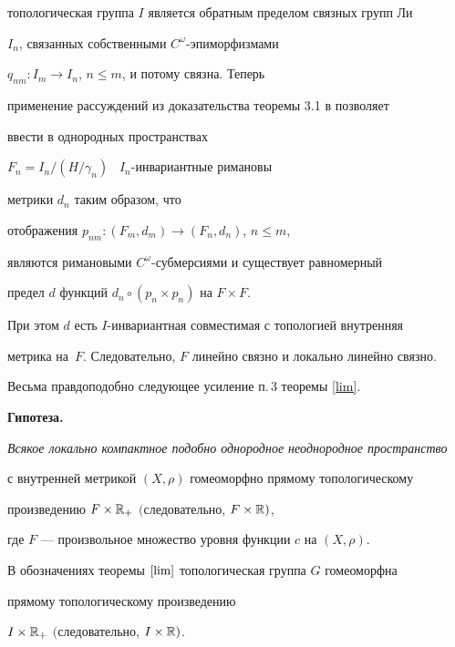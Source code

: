 \begin{pf}
топологическая группа $I$ является обратным пределом связных групп Ли


$I_{n}$, связанных собственными $C^{\omega}$-эпиморфизмами


$q_{nm}:I_{m}\rightarrow I_{n}$, $n\leq m$, и потому связна. Теперь


применение рассуждений из доказательства теоремы 3.1 в \cite{B3} позволяет


ввести в однородных пространствах


$F_{n}= I_{n}/(H/\gamma_{n})$ \ $I_{n}$-инвариантные римановы 


метрики $d_{n}$ таким образом, что


отображения $p_{nm}:(F_{m},d_{m}) \rightarrow (F_{n},d_{n})$, $n \leq m$,


являются римановыми $C^{\omega}$-суб\-мер\-си\-я\-ми и существует равномерный


предел $d$ функций $d_{n}\circ{(p_{n}\times p_{n})}$ на $F\times F$.


При этом $d$ есть $I$-инвариантная совместимая с топологией внутренняя


метрика на~$F$. Следовательно, $F$ линейно связно и локально линейно связно.


\end{pf}





Весьма правдоподобно следующее усиление п.\,3 теоремы \ref{lim}.


\medskip





{\bf Гипотеза.}


{\it Всякое локально компактное подобно однородное неоднородное пространство


с внутренней метрикой $(X,\rho)$ гомеоморфно прямому топологическому


произведению $F \times \Bbb{R}_{+}$ $($следовательно, $F \times \Bbb{R})$,


где $F$ --- произвольное множество уровня функции $c$ на $(X,\rho)$.


В обозначениях теоремы $\ref{lim}$ топологическая группа $G$ гомеоморфна


прямому топологическому произведению


$I \times \Bbb{R}_{+}$ $($следовательно, $I \times \Bbb{R})$.}








